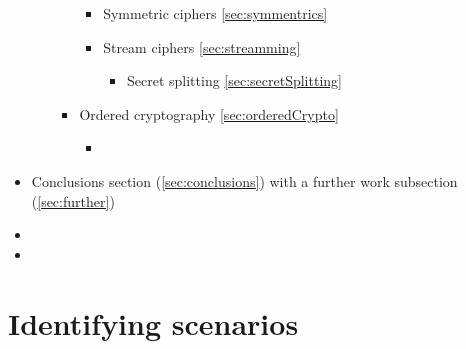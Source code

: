\documentclass[10pt,a4paper,twoside]{llncs}
\begin{document}
\begin{itemize}
\begin{itemize}
\begin{itemize}
\begin{itemize}
\begin{itemize}
                \end{itemize}
                \item Symmetric ciphers \ref{sec:symmentrics}
                \item Stream ciphers \ref{sec:streamming}
                \begin{itemize}
                    \item Secret splitting \ref{sec:secretSplitting}
                \end{itemize}
            \end{itemize}
            \item Ordered cryptography \ref{sec:orderedCrypto}
            \begin{itemize}
                \item 
            \end{itemize}
        \end{itemize}
    \end{itemize}
    \item Conclusions section (\ref{sec:conclusions}) with a further work subsection (\ref{sec:further})
    \item
    \item
\end{itemize}


\section{Identifying scenarios \label{sec:scenarios}}
\end{document}
